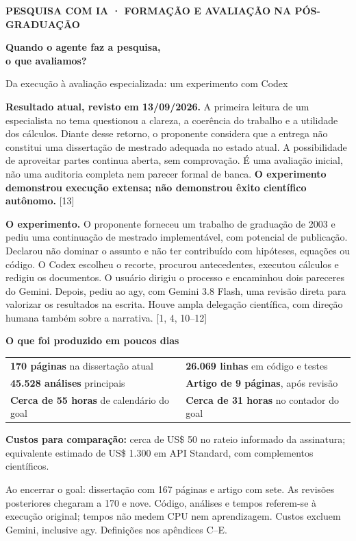 \documentclass[11pt,a4paper]{article}
\newcommand{\fonte}[1]{{\small\color{navy}[#1]}}
\begin{document}
\thispagestyle{empty}
{\small\color{teal}\textbf{PESQUISA COM IA · FORMAÇÃO E AVALIAÇÃO NA PÓS-GRADUAÇÃO}\par}
\vspace{.9cm}
{\Huge\color{navy}\bfseries Quando o agente faz a pesquisa,\\o que avaliamos?\par}
\vspace{.35cm}
{\Large Da execução à avaliação especializada: um experimento com Codex\par}
\vspace{.4cm}

\textbf{Resultado atual, revisto em 13/09/2026.} A primeira leitura de um especialista no tema questionou a clareza, a coerência do trabalho e a utilidade dos cálculos. Diante desse retorno, o proponente considera que a entrega não constitui uma dissertação de mestrado adequada no estado atual. A possibilidade de aproveitar partes continua aberta, sem comprovação. É uma avaliação inicial, não uma auditoria completa nem parecer formal de banca. \textbf{O experimento demonstrou execução extensa; não demonstrou êxito científico autônomo.} \fonte{13}

\textbf{O experimento.} O proponente forneceu um trabalho de graduação de 2003 e pediu uma continuação de mestrado implementável, com potencial de publicação. Declarou não dominar o assunto e não ter contribuído com hipóteses, equações ou código. O Codex escolheu o recorte, procurou antecedentes, executou cálculos e redigiu os documentos. O usuário dirigiu o processo e encaminhou dois pareceres do Gemini. Depois, pediu ao agy, com Gemini 3.8 Flash, uma revisão direta para valorizar os resultados na escrita. Houve ampla delegação científica, com direção humana também sobre a narrativa. \fonte{1, 4, 10--12}

\begin{destaque}
\textbf{O que foi produzido em poucos dias}\par
\begin{tabularx}{\linewidth}{@{}Y Y@{}}
\textbf{170 páginas} na dissertação atual & \textbf{26.069 linhas} em código e testes\\
\textbf{45.528 análises} principais & \textbf{Artigo de 9 páginas}, após revisão\\
\textbf{Cerca de 55 horas} de calendário do goal & \textbf{Cerca de 31 horas} no contador do goal\\
\end{tabularx}
\smallskip
\textbf{Custos para comparação:} cerca de US\$ 50 no rateio informado da assinatura; equivalente estimado de US\$ 1.300 em API Standard, com complementos científicos.\par
{\footnotesize Ao encerrar o goal: dissertação com 167 páginas e artigo com sete. As revisões posteriores chegaram a 170 e nove. Código, análises e tempos referem-se à execução original; tempos não medem CPU nem aprendizagem. Custos excluem Gemini, inclusive agy. Definições nos apêndices C--E.}
\end{destaque}
\end{document}
